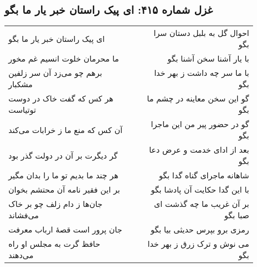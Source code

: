 \begin{center}
\section*{غزل شماره ۴۱۵: ای پیک راستان خبر یار ما بگو}
\label{sec:sh415}
\begin{longtable}{l p{0.5cm} r}
ای پیک راستان خبر یار ما بگو
&&
احوال گل به بلبل دستان سرا بگو
\\
ما محرمان خلوت انسیم غم مخور
&&
با یار آشنا سخن آشنا بگو
\\
برهم چو می‌زد آن سر زلفین مشکبار
&&
با ما سر چه داشت ز بهر خدا بگو
\\
هر کس که گفت خاک در دوست توتیاست
&&
گو این سخن معاینه در چشم ما بگو
\\
آن کس که منع ما ز خرابات می‌کند
&&
گو در حضور پیر من این ماجرا بگو
\\
گر دیگرت بر آن در دولت گذر بود
&&
بعد از ادای خدمت و عرض دعا بگو
\\
هر چند ما بدیم تو ما را بدان مگیر
&&
شاهانه ماجرای گناه گدا بگو
\\
بر این فقیر نامه آن محتشم بخوان
&&
با این گدا حکایت آن پادشا بگو
\\
جان‌ها ز دام زلف چو بر خاک می‌فشاند
&&
بر آن غریب ما چه گذشت ای صبا بگو
\\
جان پرور است قصهٔ ارباب معرفت
&&
رمزی برو بپرس حدیثی بیا بگو
\\
حافظ گرت به مجلس او راه می‌دهند
&&
می نوش و ترک زرق ز بهر خدا بگو
\\
\end{longtable}
\end{center}
